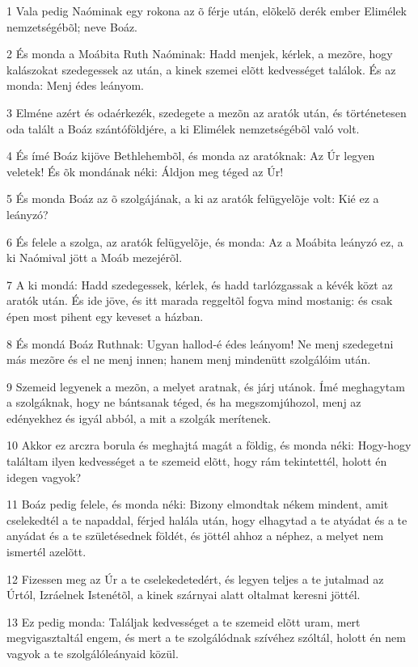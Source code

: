\par 1 Vala pedig Naóminak egy rokona az õ férje után, elõkelõ derék ember Elimélek nemzetségébõl; neve Boáz.
\par 2 És monda a Moábita Ruth Naóminak: Hadd menjek, kérlek, a mezõre, hogy kalászokat szedegessek az után, a kinek szemei elõtt kedvességet találok. És az monda: Menj édes leányom.
\par 3 Elméne azért és odaérkezék, szedegete a mezõn az aratók után, és történetesen oda talált a Boáz szántóföldjére, a ki Elimélek nemzetségébõl való volt.
\par 4 És ímé Boáz kijöve Bethlehembõl, és monda az aratóknak: Az Úr legyen veletek! És õk mondának néki: Áldjon meg téged az Úr!
\par 5 És monda Boáz az õ szolgájának, a ki az aratók felügyelõje volt: Kié ez a leányzó?
\par 6 És felele a szolga, az aratók felügyelõje, és monda: Az a Moábita leányzó ez, a ki Naómival jött a Moáb mezejérõl.
\par 7 A ki mondá: Hadd szedegessek, kérlek, és hadd tarlózgassak a kévék közt az aratók után. És ide jöve, és itt marada reggeltõl fogva mind mostanig: és csak épen most pihent egy keveset a házban.
\par 8 És mondá Boáz Ruthnak: Ugyan hallod-é édes leányom! Ne menj szedegetni más mezõre és el ne menj innen; hanem menj mindenütt szolgálóim után.
\par 9 Szemeid legyenek a mezõn, a melyet aratnak, és járj utánok. Ímé meghagytam a szolgáknak, hogy ne bántsanak téged, és ha megszomjúhozol, menj az edényekhez és igyál abból, a mit a szolgák merítenek.
\par 10 Akkor ez arczra borula és meghajtá magát a földig, és monda néki: Hogy-hogy találtam ilyen kedvességet a te szemeid elõtt, hogy rám tekintettél, holott én idegen vagyok?
\par 11 Boáz pedig felele, és monda néki: Bizony elmondtak nékem mindent, amit cselekedtél a te napaddal, férjed halála után, hogy elhagytad a te atyádat és a te anyádat és a te születésednek földét, és jöttél ahhoz a néphez, a melyet nem ismertél azelõtt.
\par 12 Fizessen meg az Úr a te cselekedetedért, és legyen teljes a te jutalmad az Úrtól, Izráelnek Istenétõl, a kinek szárnyai alatt oltalmat keresni jöttél.
\par 13 Ez pedig monda: Találjak kedvességet a te szemeid elõtt uram, mert megvigasztaltál engem, és mert a te szolgálódnak szívéhez szóltál, holott én nem vagyok a te szolgálóleányaid közül.
